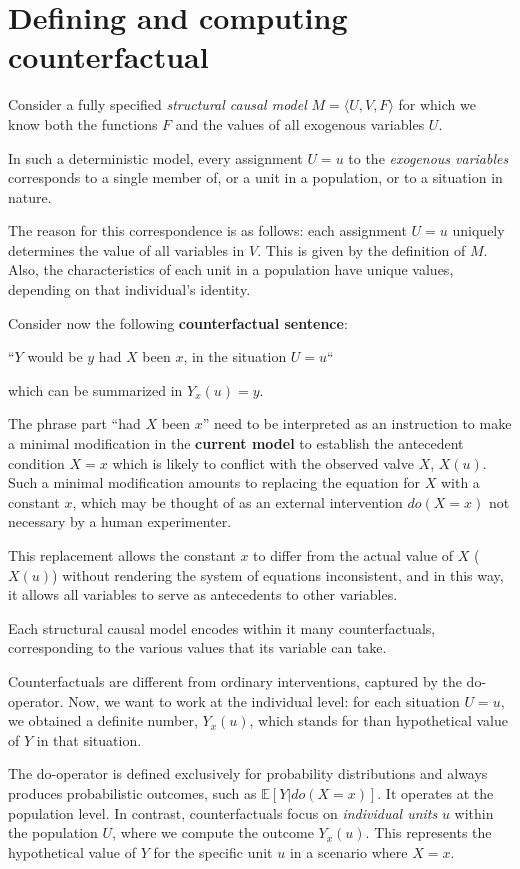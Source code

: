 \section{Defining and computing counterfactual}
Consider a fully specified \textit{structural causal model} $M=\langle U, V,F \rangle$
for which we know both the functions $F$ and the values of all exogenous variables $U$.

In such a deterministic model, every assignment $U = u$ to the \textit{exogenous variables}
corresponds to a single member of, or a unit in a population, or to a situation
in nature.

The reason for this correspondence is as follows: each assignment $U = u$ uniquely
determines the value of all variables in $V$. This is given by the definition of $M$.
Also, the characteristics of each unit in a population have unique values, depending
on that individual's identity.

Consider now the following \textbf{counterfactual sentence}:
\begin{center}
    ``$Y$ would be $y$ had $X$ been $x$, in the situation $U = u$``
\end{center}
which can be summarized in $Y_x(u) = y$.

The phrase part ``had $X$ been $x$'' need to be interpreted as an instruction to
make a minimal modification in the \textbf{current model} to establish the
antecedent condition $X = x$ which is likely to conflict with the observed valve
$X$, $X(u)$. Such a minimal modification amounts to replacing the equation for
$X$ with a constant $x$, which may be thought of as an external intervention $do(X = x)$
not necessary by a human experimenter.

This replacement allows the constant $x$ to differ from the actual value of $X$
($X(u)$) without rendering the system of equations inconsistent, and in this way,
it allows all variables to serve as antecedents to other variables.

Each structural causal model encodes within it many counterfactuals, corresponding
to the various values that its variable can take.

Counterfactuals are different from ordinary interventions, captured by the
do-operator. Now, we want to work at the individual level: for each situation $U = u$,
we obtained a definite number, $Y_x(u)$, which stands for than hypothetical value
of $Y$ in that situation.

The do-operator is defined exclusively for probability distributions and always
produces probabilistic outcomes, such as $\mathbb{E}[Y|do(X = x)]$. It operates at
the population level. In contrast, counterfactuals focus on \textit{individual units}
$u$ within the population $U$, where we compute the outcome $Y_x(u)$. This represents
the hypothetical value of $Y$ for the specific unit $u$ in a scenario where $X = x$.

